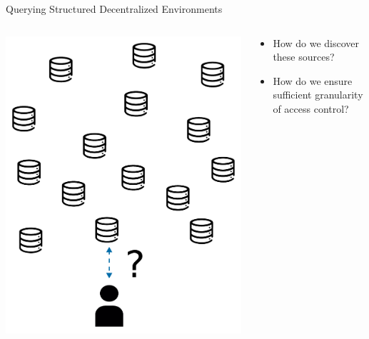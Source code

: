 \begin{frame}{Querying Structured Decentralized Environments}
    \begin{columns}[T] %
        \begin{column}{0.6\textwidth} 
            \centering%
            \includegraphics[width=.6\linewidth]{images/how-to-find-sources.pdf} %
        \end{column}

        \begin{column}{0.4\textwidth} %
            \begin{itemize}
                \item How do we discover these sources?
                \item How do we ensure sufficient granularity of access control?
            \end{itemize}
        \end{column}
    \end{columns}
\end{frame}

